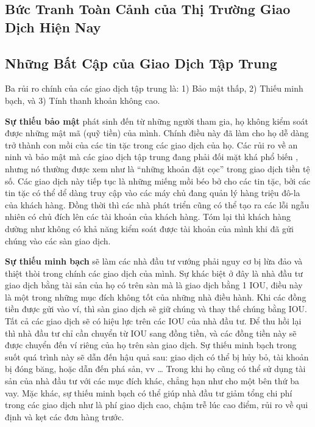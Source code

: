 \documentclass{article}
\begin{document}
\begin{multicols}{2}
\section{Bức Tranh Toàn Cảnh của Thị Trường Giao Dịch Hiện Nay\label{sec:current_exchange_landscape}}

\subsection{Những Bất Cập của Giao Dịch Tập Trung}
Ba rủi ro chính của các giao dịch tập trung là: 1) Bảo mật thấp, 2) Thiếu minh bạch, và 3) Tính thanh khoản không cao.

\textbf{Sự thiếu bảo mật} phát sinh đến từ những người tham gia, họ không kiểm soát được những mật mã (quỹ tiền) của mình. Chính điều này đã làm cho họ dễ dàng trở thành con mồi của các tin tặc trong các giao dịch của họ. Các rủi ro về an ninh và bảo mật mà các giao dịch tập trung đang phải đối mặt khá phổ biến \cite{coincheckhack}  \cite{mcmillan2014inside}, nhưng nó thường được xem như là \enquote{những khoản đặt cọc} trong giao dịch tiền tệ số. Các giao dịch này tiếp tục là những miếng mồi béo bở cho các tin tặc, bởi các tin tặc có thể dể dàng truy cập vào các máy chủ đang quản lý hàng triệu đô-la của khách hàng. Đồng thời thì các nhà phát triển cũng có thể tạo ra các lỗi ngẫu nhiên có chủ đích lên các tài khoản của khách hàng. Tóm lại thì khách hàng dường như không có khả năng kiểm soát được tài khoản của mình khi đã gửi chúng vào các sàn giao dịch.

\textbf{Sự thiếu minh bạch} sẽ làm các nhà đầu tư vướng phải nguy cơ bị lừa đảo và thiệt thòi trong chính các giao dịch của mình. Sự khác biệt ở đây là nhà đầu tư giao dịch bằng tài sản của họ có trên sàn mà là giao dịch bằng 1 IOU, điều này là một trong những mục đích không tốt của những nhà điều hành. Khi các đồng tiền được gửi vào ví, thì sàn giao dịch sẽ giữ chúng và thay thế chúng bằng IOU. Tất cả các giao dịch sẽ có hiệu lực trên các IOU của nhà đầu tư. Để thu hồi lại thì nhà đầu tư chỉ cần chuyển từ IOU sang đồng tiền, và các đồng tiền này sẽ được chuyển đến ví riêng của họ trên sàn giao dịch. Sự thiếu minh bạch trong suốt quá trình này sẽ dẫn đến hậu quả sau: giao dịch có thể bị hủy bỏ, tài khoản bị đóng băng, hoặc dẫn đến phá sản, vv … Trong khi họ cũng có thể sử dụng tài sản của nhà đầu tư với các mục đích khác, chẳng hạn như cho một bên thứ ba vay. Mặc khác, sự thiếu minh bạch có thể giúp nhà đầu tư giảm tổng chi phí trong các giao dịch như là phí giao dịch cao, chậm trễ lúc cao điểm, rủi ro về qui định và kẹt các đơn hàng trước.


\end{multicols}
\end{document}
